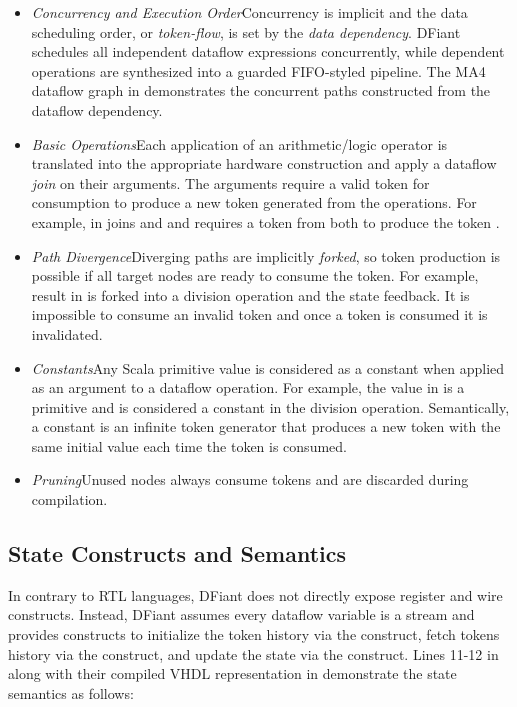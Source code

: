 \begin{itemize}[leftmargin=*]
	\item \textit{Concurrency and Execution Order}\quad Concurrency is implicit and the data scheduling order, or \textit{token-flow}, is set by the \textit{data dependency}. DFiant schedules all independent dataflow expressions concurrently, while dependent operations are synthesized into a guarded FIFO-styled pipeline. The MA4 dataflow graph in  demonstrates the concurrent paths constructed from the dataflow dependency. 
	\item \textit{Basic Operations}\quad Each application of an arithmetic/logic operator is translated into the appropriate hardware construction and apply a dataflow \emph{join} on their arguments. The arguments require a valid token for consumption to produce a new token generated from the operations. For example, \code{+} in  joins  and  and requires a token from both to produce the token .
	\item \textit{Path Divergence}\quad Diverging paths are implicitly \emph{forked}, so token production is possible if all target nodes are ready to consume the token. For example,  result in  is forked into a division operation and the state feedback.	It is impossible to consume an invalid token and once a token is consumed it is invalidated.
	\item \textit{Constants}\quad Any Scala primitive value is considered as a constant when applied as an argument to a dataflow operation. For example, the value  in  is a primitive  and is considered a constant in the division operation. Semantically, a constant is an infinite token generator that produces a new token with the same initial value each time the token is consumed.
	\item \textit{Pruning}\quad Unused nodes always consume tokens and are discarded during compilation. 
\end{itemize} 



\subsection{State Constructs and Semantics}
\label{sec:state_constructs}
In contrary to RTL languages, DFiant does not directly expose register and wire constructs. Instead, DFiant assumes every dataflow variable is a stream and provides constructs to initialize the token history via the  construct, fetch tokens history via the  construct, and update the state via the \code{:=} construct. Lines 11-12 in  along with their compiled VHDL representation in  demonstrate the state semantics as follows:

